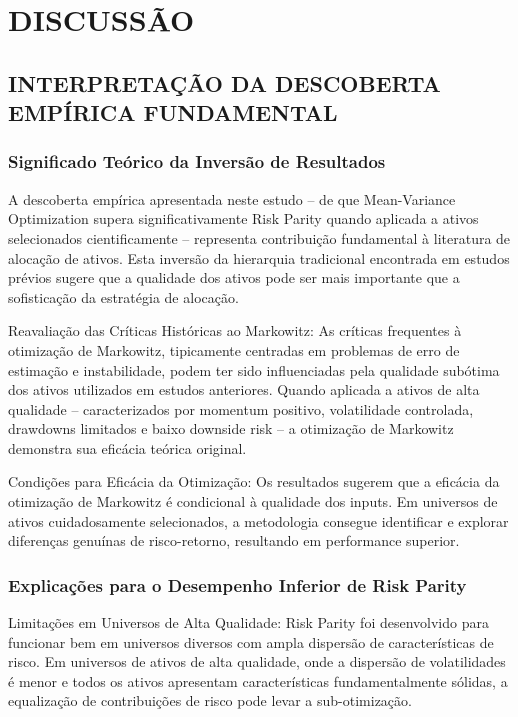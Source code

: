 
\chapter{DISCUSSÃO}

\section{INTERPRETAÇÃO DA DESCOBERTA EMPÍRICA FUNDAMENTAL}

\subsection{Significado Teórico da Inversão de Resultados}

A descoberta empírica apresentada neste estudo – de que Mean-Variance Optimization supera significativamente Risk Parity quando aplicada a ativos selecionados cientificamente – representa contribuição fundamental à literatura de alocação de ativos. Esta inversão da hierarquia tradicional encontrada em estudos prévios sugere que a qualidade dos ativos pode ser mais importante que a sofisticação da estratégia de alocação.

Reavaliação das Críticas Históricas ao Markowitz: As críticas frequentes à otimização de Markowitz, tipicamente centradas em problemas de erro de estimação e instabilidade, podem ter sido influenciadas pela qualidade subótima dos ativos utilizados em estudos anteriores. Quando aplicada a ativos de alta qualidade – caracterizados por momentum positivo, volatilidade controlada, drawdowns limitados e baixo downside risk – a otimização de Markowitz demonstra sua eficácia teórica original.

Condições para Eficácia da Otimização: Os resultados sugerem que a eficácia da otimização de Markowitz é condicional à qualidade dos inputs. Em universos de ativos cuidadosamente selecionados, a metodologia consegue identificar e explorar diferenças genuínas de risco-retorno, resultando em performance superior.

\subsection{Explicações para o Desempenho Inferior de Risk Parity}

Limitações em Universos de Alta Qualidade: Risk Parity foi desenvolvido para funcionar bem em universos diversos com ampla dispersão de características de risco. Em universos de ativos de alta qualidade, onde a dispersão de volatilidades é menor e todos os ativos apresentam características fundamentalmente sólidas, a equalização de contribuições de risco pode levar a sub-otimização.

